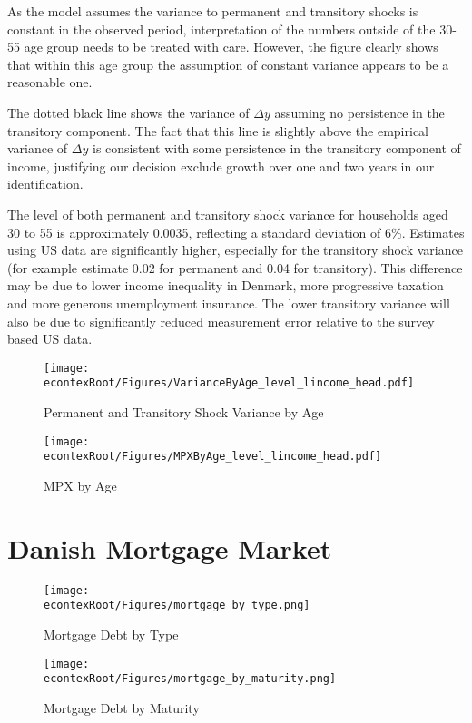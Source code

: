 \documentclass[titlepage]{\econtex}\newcommand{\texname}{ConsumptionHeterogeneity}
\begin{document}
As the model assumes the variance to permanent and transitory shocks is constant in the observed period, interpretation of the numbers outside of the 30-55 age group needs to be treated with care. However, the figure clearly shows that within this age group the assumption of constant variance appears to be a reasonable one.

The dotted black line shows the variance of $\Delta y$ assuming no persistence in the transitory component. The fact that this line is slightly above the empirical variance of $\Delta y$ is consistent with some persistence in the transitory component of income, justifying our decision exclude growth over one and two years in our identification.

The level of both permanent and transitory shock variance for households aged 30 to 55 is approximately 0.0035, reflecting a standard deviation of 6\%. Estimates using US data are significantly higher, especially for the transitory shock variance (for example \cite{carroll_nature_1997} estimate 0.02 for permanent and 0.04 for transitory). This difference may be due to lower income inequality in Denmark, more progressive taxation and more generous unemployment insurance. The lower transitory variance will also be due to significantly reduced measurement error relative to the survey based US data. 
\begin{figure} 
	\begin{centering}
		\texttt{[image: \\econtexRoot/Figures/VarianceByAge\_level\_lincome\_head.pdf]} 
		\caption{Permanent and Transitory Shock Variance by Age}
		\label{fig:VarianceByAge}
	\end{centering}
\end{figure}
\begin{figure} 
	\begin{centering}
		\texttt{[image: \\econtexRoot/Figures/MPXByAge\_level\_lincome\_head.pdf]} 
		\caption{MPX by Age}
		\label{fig:MPXByAge}
	\end{centering}
\end{figure}

\section{Danish Mortgage Market} \label{mortgage_market}
\begin{figure} 
	\begin{centering}
		\texttt{[image: \\econtexRoot/Figures/mortgage\_by\_type.png]} 
		\caption{Mortgage Debt by Type}
		\label{fig:mortgage_by_type}
	\end{centering}
\end{figure}
\begin{figure} 
	\begin{centering}
		\texttt{[image: \\econtexRoot/Figures/mortgage\_by\_maturity.png]} 
		\caption{Mortgage Debt by Maturity}
		\label{fig:mortgage_by_maturity}
	\end{centering}
\end{figure}





\end{document}
